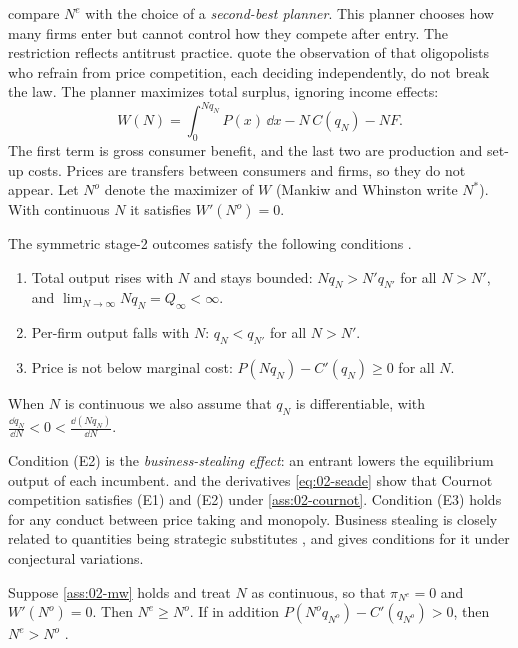 \citet{MankiwWhinston1986} compare $N^e$ with the choice of a \emph{second-best planner}. This planner chooses how
many firms enter but cannot control how they compete after entry. The restriction reflects antitrust practice.
\citet[p.~50]{MankiwWhinston1986} quote the observation of \citet[p.~525]{Scherer1980} that oligopolists who
refrain from price competition, each deciding independently, do not break the law. The planner maximizes total
surplus, ignoring income effects:
\begin{equation}\label{eq:02-mw-welfare}
W(N) = \int_0^{N q_N} P(x)\, \dd x - N\, C(q_N) - N F .
\end{equation}
The first term is gross consumer benefit, and the last two are production and set-up costs. Prices are transfers
between consumers and firms, so they do not appear. Let $N^o$ denote the maximizer of $W$ (Mankiw and Whinston
write $N^*$). With continuous $N$ it satisfies $W'(N^o) = 0$.

\begin{assumption}\label{ass:02-mw}
The symmetric stage-2 outcomes satisfy the following conditions \citep[p.~51]{MankiwWhinston1986}.
\begin{enumerate}[label=(E\arabic*)]
\item Total output rises with $N$ and stays bounded: $N q_N > N' q_{N'}$ for all $N > N'$, and
  $\lim_{N\to\infty} N q_N = Q_\infty < \infty$.
\item Per-firm output falls with $N$: $q_N < q_{N'}$ for all $N > N'$.
\item Price is not below marginal cost: $P(N q_N) - C'(q_N) \ge 0$ for all $N$.
\end{enumerate}
When $N$ is continuous we also assume that $q_N$ is differentiable, with $\frac{\dd q_N}{\dd N} < 0 <
\frac{\dd (N q_N)}{\dd N}$.
\end{assumption}

Condition (E2) is the \emph{business-stealing effect}: an entrant lowers the equilibrium output of each incumbent.
 and the derivatives \eqref{eq:02-seade} show that Cournot competition satisfies (E1) and
(E2) under \cref{ass:02-cournot}. Condition
(E3) holds for any conduct between price taking and monopoly. Business stealing is closely related to quantities
being strategic substitutes \citep{BulowGeanakoplosKlemperer1985}, and \citet{Seade1980} gives conditions for it
under conjectural variations.

\begin{proposition}\label{prop:02-mw-excess}
Suppose \cref{ass:02-mw} holds and treat $N$ as continuous, so that $\pi_{N^e} = 0$ and $W'(N^o) = 0$. Then
$N^e \ge N^o$. If in addition $P(N^o q_{N^o}) - C'(q_{N^o}) > 0$, then $N^e > N^o$
\citep[Proposition~1]{MankiwWhinston1986}.
\end{proposition}

